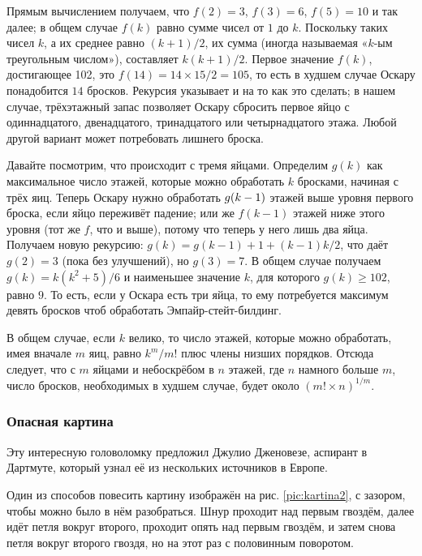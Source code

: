 Прямым вычислением получаем, что $f(2) = 3$, $f(3) = 6$, $f(5) = 10$ и так далее; в общем случае $f(k)$ равно сумме чисел от $1$ до $k$.
Поскольку таких чисел $k$, а их среднее равно $(k + 1)/2$, их сумма (иногда называемая «$k$-ым треугольным числом»), составляет $k(k + 1)/2$.
Первое значение $f(k)$, достигающее 102, это $f(14) = 14 \times 15/2 = 105$, то есть в худшем случае Оскару понадобится $14$ бросков.
Рекурсия указывает и на то как это сделать;
в нашем случае, трёхэтажный запас позволяет Оскару сбросить первое яйцо с одиннадцатого, двенадцатого, тринадцатого или четырнадцатого этажа.
Любой другой вариант может потребовать лишнего броска.

Давайте посмотрим, что происходит с тремя яйцами.
Определим $g(k)$ как максимальное число этажей, которые можно обработать $k$ бросками, начиная с трёх яиц.
Теперь Оскару нужно обработать $g(k \z- 1)$ этажей выше уровня первого броска, если яйцо переживёт падение;
или же $f(k - 1)$ этажей ниже этого уровня (тот же $f$, что и выше), потому что теперь у него лишь два яйца.
Получаем новую рекурсию: $g(k) = g(k-1) + 1 + (k - 1)k/2$, что даёт $g(2) = 3$ (пока без улучшений), но $g(3) = 7$.
В общем случае получаем $g(k)=k(k^2+5)/6$ и наименьшее значение $k$, для которого 
$g(k)\ge 102$, равно $9$.
То есть, если у Оскара есть три яйца,
то ему потребуется максимум девять бросков чтоб обработать Эмпайр-стейт-билдинг.

В общем случае, если $k$ велико, то число этажей, которые можно обработать, имея вначале $m$ яиц, равно $k^m/m!$ плюс члены низших порядков.
Отсюда следует, что с $m$ яйцами и небоскрёбом в $n$ этажей, где  $n$ намного больше $m$, число бросков, необходимых в худшем случае, будет около $(m!\times n)^{1/m}$.

\subsubsection*{Опасная картина}

Эту интересную головоломку предложил Джулио Дженовезе, аспирант в Дартмуте, который узнал её из нескольких источников в Европе.

Один из способов повесить картину изображён на рис. \ref{pic:kartina2}, с зазором, чтобы можно было в нём разобраться.
Шнур проходит над первым гвоздём,
далее идёт петля вокруг второго,
проходит опять над первым гвоздём, и затем снова петля вокруг второго гвоздя, но на этот раз с половинным поворотом.

